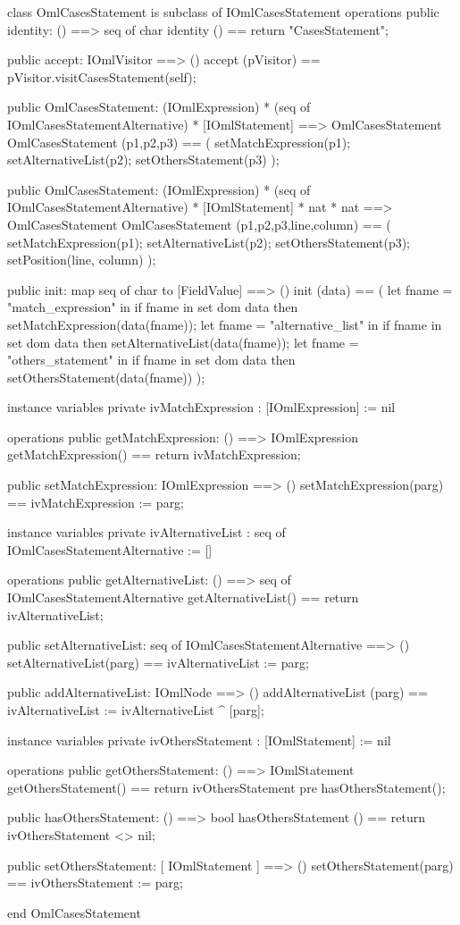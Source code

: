 \begin{vdm_al}
class OmlCasesStatement is subclass of IOmlCasesStatement
operations
  public identity: () ==> seq of char
  identity () == return "CasesStatement";

  public accept: IOmlVisitor ==> ()
  accept (pVisitor) == pVisitor.visitCasesStatement(self);

  public OmlCasesStatement:
    (IOmlExpression) *
    (seq of IOmlCasesStatementAlternative) *
    [IOmlStatement] ==> OmlCasesStatement
  OmlCasesStatement (p1,p2,p3) == 
    ( setMatchExpression(p1);
      setAlternativeList(p2);
      setOthersStatement(p3) );

  public OmlCasesStatement:
    (IOmlExpression) *
    (seq of IOmlCasesStatementAlternative) *
    [IOmlStatement] *
    nat *
    nat ==> OmlCasesStatement
  OmlCasesStatement (p1,p2,p3,line,column) == 
    ( setMatchExpression(p1);
      setAlternativeList(p2);
      setOthersStatement(p3);
      setPosition(line, column) );

  public init: map seq of char to [FieldValue] ==> ()
  init (data) ==
    ( let fname = "match_expression" in
        if fname in set dom data
        then setMatchExpression(data(fname));
      let fname = "alternative_list" in
        if fname in set dom data
        then setAlternativeList(data(fname));
      let fname = "others_statement" in
        if fname in set dom data
        then setOthersStatement(data(fname)) );

instance variables
  private ivMatchExpression : [IOmlExpression] := nil

operations
  public getMatchExpression: () ==> IOmlExpression
  getMatchExpression() == return ivMatchExpression;

  public setMatchExpression: IOmlExpression ==> ()
  setMatchExpression(parg) == ivMatchExpression := parg;

instance variables
  private ivAlternativeList : seq of IOmlCasesStatementAlternative := []

operations
  public getAlternativeList: () ==> seq of IOmlCasesStatementAlternative
  getAlternativeList() == return ivAlternativeList;

  public setAlternativeList: seq of IOmlCasesStatementAlternative ==> ()
  setAlternativeList(parg) == ivAlternativeList := parg;

  public addAlternativeList: IOmlNode ==> ()
  addAlternativeList (parg) == ivAlternativeList := ivAlternativeList ^ [parg];

instance variables
  private ivOthersStatement : [IOmlStatement] := nil

operations
  public getOthersStatement: () ==> IOmlStatement
  getOthersStatement() == return ivOthersStatement
    pre hasOthersStatement();

  public hasOthersStatement: () ==> bool
  hasOthersStatement () == return ivOthersStatement <> nil;

  public setOthersStatement: [ IOmlStatement ] ==> ()
  setOthersStatement(parg) == ivOthersStatement := parg;

end OmlCasesStatement
\end{vdm_al}

